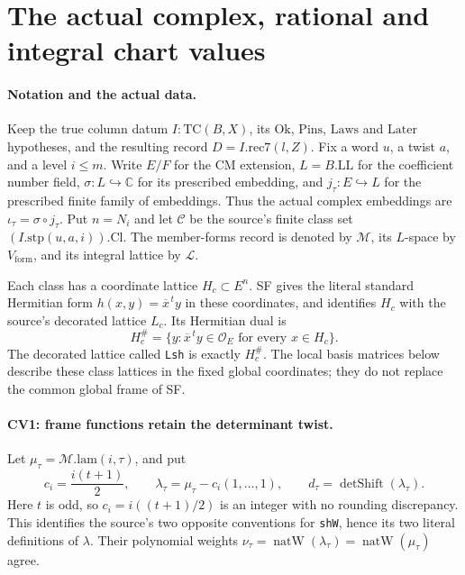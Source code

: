 \section{The actual complex, rational and integral chart values}
\label{sec:chart-values}


\paragraph{Notation and the actual data.}
Keep the true column datum \(I:\mathrm{TC}(B,X)\), its
\(\mathrm{Ok}\), \(\mathrm{Pins}\), \(\mathrm{Laws}\) and
\(\mathrm{Later}\) hypotheses, and the resulting record
\(D=I.\mathrm{rec7}(l,Z)\). Fix a word \(u\), a twist \(a\), and
a level \(i\le m\). Write \(E/F\) for the CM extension,
\(L=B.\mathrm{LL}\) for the coefficient number field,
\(\sigma:L\hookrightarrow\mathbb C\) for its prescribed embedding,
and \(j_\tau:E\hookrightarrow L\) for the prescribed finite family
of embeddings. Thus the actual complex embeddings are
\(\iota_\tau=\sigma\circ j_\tau\). Put \(n=N_i\) and let
\(\mathcal C\) be the source's finite class set
\((I.\mathrm{stp}(u,a,i)).\mathrm{Cl}\).
The member-forms record is denoted by \(\mathcal M\), its
\(L\)-space by \(V_{\mathrm{form}}\), and its integral lattice
by \(\mathcal L\).

Each class has a coordinate lattice \(H_c\subset E^n\).
SF gives the literal standard Hermitian form
\(h(x,y)=\overline{x}^{\,t}y\) in these coordinates, and
identifies \(H_c\) with the source's decorated lattice \(L_c\).
Its Hermitian dual is
\[
 H_c^\#=\{y:\overline{x}^{\,t}y\in\mathcal O_E
                           \text{ for every }x\in H_c\}.
\]
The decorated lattice called \texttt{Lsh} is exactly \(H_c^\#\).
The local basis matrices below describe these class lattices in
the fixed global coordinates; they do not replace the common
global frame of SF.

\paragraph{CV1: frame functions retain the determinant twist.}
Let \(\mu_\tau=\mathcal M.\mathrm{lam}(i,\tau)\), and put
\[
 c_i=\frac{i(t+1)}2,\qquad
 \lambda_\tau=\mu_\tau-c_i(1,\ldots,1),\qquad
 d_\tau=\operatorname{detShift}(\lambda_\tau).
                                                               \tag{CV.1}
\]
Here \(t\) is odd, so \(c_i=i((t+1)/2)\) is an integer with
no rounding discrepancy. This identifies the source's two
opposite conventions for \texttt{shW}, hence its two literal
definitions of \(\lambda\). Their polynomial weights
\(\nu_\tau=\operatorname{natW}(\lambda_\tau)
=\operatorname{natW}(\mu_\tau)\) agree.


